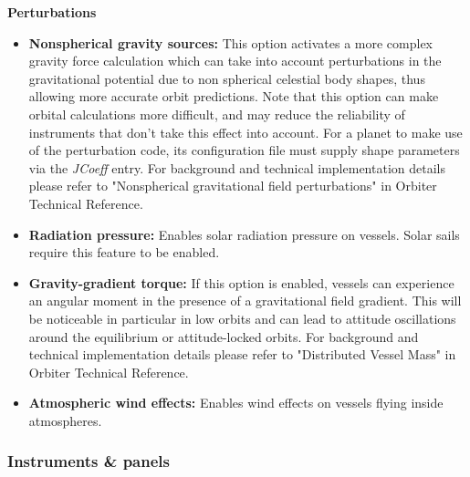 \documentclass[Orbiter User Manual.tex]{subfiles}
\begin{document}
\textbf{Perturbations}
\begin{itemize}
\item \textbf{Nonspherical gravity sources:} This option activates a more complex gravity force calculation which can take into account perturbations in the gravitational potential due to non spherical celestial body shapes, thus allowing more accurate orbit predictions. Note that this option can make orbital calculations more difficult, and may reduce the reliability of instruments that don't take this effect into account. For a planet to make use of the perturbation code, its configuration file must supply shape parameters via the \textit{JCoeff} entry. For background and technical implementation details please refer to "Nonspherical gravitational field perturbations" in Orbiter Technical Reference.
\item \textbf{Radiation pressure:} Enables solar radiation pressure on vessels. Solar sails require this feature to be enabled.
\item \textbf{Gravity-gradient torque:} If this option is enabled, vessels can experience an angular moment in the presence of a gravitational field gradient. This will be noticeable in particular in low orbits and can lead to attitude oscillations around the equilibrium or attitude-locked orbits. For background and technical implementation details please refer to "Distributed Vessel Mass" in Orbiter Technical Reference.
\item \textbf{Atmospheric wind effects:} Enables wind effects on vessels flying inside atmospheres.
\end{itemize}

\subsubsection{Instruments \& panels}
\label{sssec:launchpad_instr_panels}
\begin{figure}[H]
	\centering
\end{figure}
\end{document}
